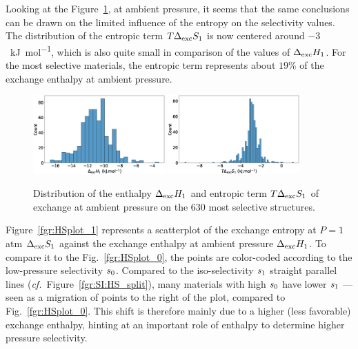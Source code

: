 \documentclass[main.tex]{subfiles}
\begin{document}
Looking at the Figure~\ref{fgr:SI:dist1}, at ambient pressure, it seems that the same conclusions can be drawn on the limited influence of the entropy on the selectivity values. The distribution of the entropic term $T\Delta_{\text{exc}}S_{\text{1}}$ is now centered around $-3$~\si{\kilo\joule\per\mole}, which is also quite small in comparison of the values of $\Delta_{\text{exc}}H_{\text{1}}$. For the most selective materials, the entropic term represents about {$19$\%} of the exchange enthalpy at ambient pressure.

\begin{figure}[ht]
  \centering
    \includegraphics[width=0.45\textwidth]{figures/2-thermo/Delta_H_2080.jpg}
    \includegraphics[width=0.45\textwidth]{figures/2-thermo/T_Delta_S_2080.jpg}
    \caption{Distribution of the enthalpy $\Delta_{\text{exc}}H_{\text{1}}$ and entropic term $T\Delta_{\text{exc}}S_{\text{1}}$ of exchange at ambient pressure on the 630 most selective structures.}\label{fgr:SI:dist1}
\end{figure}

Figure~\ref{fgr:HSplot_1} represents a scatterplot of the exchange entropy at $P = 1$\,atm $\Delta_{\text{exc}}S_{\text{1}}$ against the exchange enthalpy at ambient pressure $\Delta_{\text{exc}}H_{\text{1}}$. To compare it to the Fig.~\ref{fgr:HSplot_0}, the points are color-coded according to the low-pressure selectivity $s_{\text{0}}$. Compared to the iso-selectivity $s_{\text{1}}$ straight parallel lines (\emph{cf.}~Figure~\ref{fgr:SI:HS_split}), many materials with high $s_{\text{0}}$ have lower $s_{\text{1}}$ --- seen as a migration of points to the right of the plot, compared to Fig.~\ref{fgr:HSplot_0}. This shift is therefore mainly due to a higher (less favorable) exchange enthalpy, hinting at an important role of enthalpy to determine higher pressure selectivity.
\end{document}
